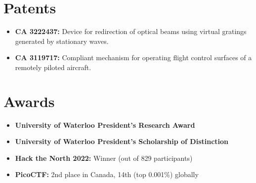 \documentclass[letterpaper,11pt]{article}
\newcommand{\resumeItem}[1]{\item\small{#1 \vspace{-2pt}}}
\newcommand{\skillListStart}{\begin{itemize}[leftmargin=0.15in, label={}, itemsep=-3pt]}
\newcommand{\skillListEnd}{\end{itemize}}
\begin{document}
\section{Patents}
\skillListStart
    \resumeItem{\textbf{CA 3222437:} Device for redirection of optical beams using virtual gratings generated by stationary waves.
        }
    \resumeItem{\textbf{CA 3119717:} Compliant mechanism for operating flight control surfaces of a remotely piloted aircraft.
    }

\skillListEnd

\section{Awards}
\skillListStart
    \resumeItem{\textbf{University of Waterloo President's Research Award}}
\resumeItem{\textbf{University of Waterloo  President's Scholarship of Distinction}}
    \resumeItem{\textbf{Hack the North 2022:} Winner (out of 829 participants)}
    \resumeItem{\textbf{PicoCTF:} 2nd place in Canada, 14th (top 0.001\%) globally}
\skillListEnd
\end{document}
